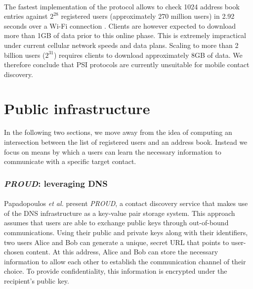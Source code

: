 \paragraph{} The fastest implementation of the protocol allows to check 1024 address book entries against $2^{28}$ registered users (approximately 270 million users) in 2.92 seconds over a Wi-Fi connection \cite{Kales19}. Clients are however expected to download more than 1GB of data prior to this online phase. This is extremely impractical under current cellular network speeds and data plans. Scaling to more than 2 billion users ($2^{31}$) requires clients to download approximately 8GB of data. We therefore conclude that PSI protocols are currently unsuitable for mobile contact discovery.




\section{Public infrastructure}
\label{sec:PKI}

\paragraph{} In the following two sections, we move away from the idea of computing an intersection between the list of registered users and an address book. Instead we focus on means by which a users can learn the necessary information to communicate with a specific target contact.

\subsubsection{\textit{PROUD}: leveraging DNS}

\paragraph{} Papadopoulos \textit{et al.} \cite{Papadopoulos18} present \textit{PROUD}, a contact discovery service that makes use of the DNS infrastructure as a key-value pair storage system. This approach assumes that users are able to exchange public keys through out-of-bound communications. Using their public and private keys along with their identifiers, two users Alice and Bob can generate a unique, secret URL that points to user-chosen content. At this address, Alice and Bob can store the necessary information to allow each other to establish the communication channel of their choice. To provide confidentiality, this information is encrypted under the recipient's public key.

